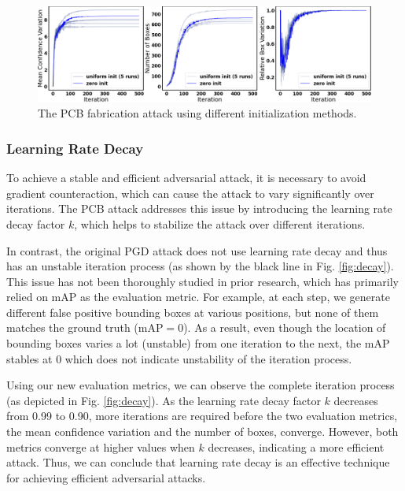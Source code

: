 
\begin{figure}[btph]
    \centering
    \includegraphics[width=0.9\linewidth]{figures/chapter_detection/init.png}
    \caption{The PCB fabrication attack using different initialization methods.}
    \label{fig:init}
\end{figure}

\subsubsection{Learning Rate Decay}

To achieve a stable and efficient adversarial attack, it is necessary to avoid gradient counteraction, which can cause the attack to vary significantly over iterations. The PCB attack addresses this issue by introducing the learning rate decay factor $k$, which helps to stabilize the attack over different iterations.

In contrast, the original PGD attack does not use learning rate decay and thus has an unstable iteration process (as shown by the black line in Fig. \ref{fig:decay}). This issue has not been thoroughly studied in prior research, which has primarily relied on mAP as the evaluation metric.  For example, at each step, we generate different false positive bounding boxes at various positions, but none of them matches the ground truth (mAP$=0$). As a result, even though the location of bounding boxes varies a lot (unstable) from one iteration to the next, the mAP stables at 0 which does not indicate unstability of the iteration process.

Using our new evaluation metrics, we can observe the complete iteration process (as depicted in Fig. \ref{fig:decay}). As the learning rate decay factor $k$ decreases from 0.99 to 0.90, more iterations are required before the two evaluation metrics, the mean confidence variation and the number of boxes, converge. However, both metrics converge at higher values when $k$ decreases, indicating a more efficient attack. Thus, we can conclude that learning rate decay is an effective technique for achieving efficient adversarial attacks.

